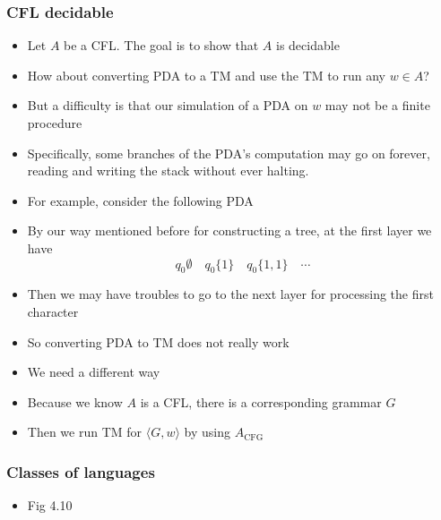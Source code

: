 \begin{frame}[allowframebreaks] \frametitle{CFL decidable}
  \begin{itemize}
  \item
    Let $A$ be a CFL. The goal is to show that
    $A$ is decidable
  \item How about converting PDA to a TM and use the TM to run any
    $w \in A$?
  \item But a difficulty is that our simulation of a PDA
    on $w$ may not be a finite procedure

\item Specifically,  some
branches of the PDA's computation may go on forever, reading and writing the
stack without ever halting.
\item For example, consider the following PDA
    \begin{center}
\end{center}
\item By our way mentioned before for constructing a tree,
  at the first layer we have
  \begin{equation*}
    q_0 \emptyset \quad q_0 \{1\} \quad q_0 \{1,1\} \quad \cdots
  \end{equation*}
\item Then we may have troubles to go to the next layer
  for processing the first character
\item So converting PDA to TM does not really work
\item We need a different way
\item Because we know $A$ is a CFL, there is a corresponding
  grammar $G$
\item Then we run TM for $\langle  G,w\rangle $ by using 
$A_{\text{CFG}}$
\end{itemize}\end{frame}

\begin{frame}[allowframebreaks] \frametitle{Classes of languages}
  \begin{itemize}
  \item Fig 4.10

\begin{center}
    \end{center}
  \end{itemize}\end{frame}



